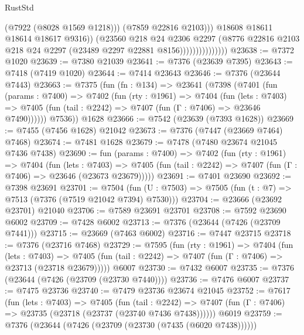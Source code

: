 \begin{lexlean}{RustStd}
\begin{coremodule}
                                      (@7922 (@8028 @1569 @1218)))
                                    (@7859 @22816 @2103)))
                                @18608
                                @18611
                                @18614
                                @18617
                                @9316))
                            (@23560
                              @218
                              @24
                              @2306
                              @2297
                              (@8776
                                @22816
                                @2103
                                @218
                                @24
                                @2297
                                (@23489 @2297 @22881 @8156)))))))))))))))
@23638 := @7372 @1020
@23639 := @7380 @21039
@23641 := @7376 (@23639 @7395)
@23643 := @7418 (@7419 @1020)
@23644 := @7414 @23643
@23646 := @7376 (@23644 @7443)
@23663 := @7375
    (fun (fn : @134) =>
    @23641
      (@7398
        (@7401
          (fun (params : @7400) =>
          @7402
            (fun (rty : @1961) =>
            @7404
              (fun (lets : @7403) =>
              @7405 (fun (tail : @2242) => @7407 (fun (Γ : @7406) => @23646 @7490))))))
        @7536))
    @1628
@23666 := @7542 (@23639 (@7393 @1628))
@23669 := @7455 (@7456 @1628) @21042
@23673 := @7376 (@7447 (@23669 @7464) @7468)
@23674 := @7481 @1628
@23679 := @7478 (@7480 @23674 @21045 @7436 @7438)
@23690 := fun (params : @7400) =>
  @7402
    (fun (rty : @1961) =>
    @7404
      (fun (lets : @7403) =>
      @7405 (fun (tail : @2242) => @7407 (fun (Γ : @7406) => @23646 (@23673 @23679)))))
@23691 := @7401 @23690
@23692 := @7398 @23691
@23701 := @7504
    (fun (U : @7503) => @7505 (fun (t : @7) => @7513 (@7376 (@7519 @21042 @7394) @7530)))
@23704 := @23666 (@23692 @23701) @21040
@23706 := @7589 @23691 @23701
@23708 := @7592 @23690 @6002
@23709 := @7428 @6002
@23713 := @7376 (@23644 (@7426 (@23709 @7441)))
@23715 := @23669 (@7463 @6002)
@23716 := @7447 @23715
@23718 := @7376 (@23716 @7468)
@23729 := @7595
    (fun (rty : @1961) =>
    @7404
      (fun (lets : @7403) =>
      @7405 (fun (tail : @2242) => @7407 (fun (Γ : @7406) => @23713 (@23718 @23679)))))
    @6007
@23730 := @7432 @6007
@23735 := @7376 (@23644 (@7426 (@23709 (@23730 @7440))))
@23736 := @7476 @6007
@23737 := @7475 @23736
@23740 := @7479 @23736 @23674 @21045
@23752 := @7617
    (fun (lets : @7403) =>
    @7405
      (fun (tail : @2242) =>
      @7407 (fun (Γ : @7406) => @23735 (@23718 (@23737 (@23740 @7436 @7438))))))
    @6019
@23759 := @7376 (@23644 (@7426 (@23709 (@23730 (@7435 (@6020 @7438))))))

\end{coremodule}
\end{lexlean}
